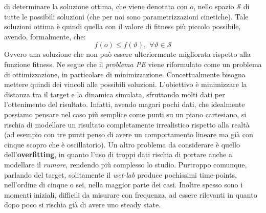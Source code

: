 \documentclass[a4paper,12pt, oneside]{book}
\begin{document}
di 
determinare la soluzione ottima, che viene denotata con $o$, nello spazio
$\mathcal{S}$ di tutte le possibili soluzioni (che per noi sono
parametrizzazioni cinetiche). Tale soluzioni ottima è quindi quella con il
valore di fitness più piccolo possibile, avendo, formalmente, che:
\[f(o)\leq f(\vartheta),\,\,\forall\vartheta\in \mathcal{S}\]
Ovvero una soluzione che non può essere ulteriormente migliorata rispetto alla
funzione fitness. Ne segue che il \textit{problema PE} viene riformulato come un
problema di ottimizzazione, in particolare di minimizzazione. Concettualmente
bisogna mettere quindi dei vincoli alle possibili soluzioni. L'obiettivo è
minimizzare la distanza tra il target e la dinamica simulata, sfruttando molti
dati per l'ottenimento del risultato. Infatti, avendo magari pochi dati, che
idealmente possiamo pensare nel caso più semplice come punti su un piano
cartesiano, si rischia di modellare un risultato completamente irrealistico
rispetto alla realtà (ad esempio con tre punti penso di avere un comportamento
lineare ma già con cinque scopro che è oscillatorio).
Un altro problema da considerare è quello dell'\textbf{overfitting}, in quanto
l'uso di troppi dati rischia di portare anche a modellare il \textit{rumore},
rendendo più complesso lo studio. Purtroppo comunque, parlando del target,
solitamente il \textit{wet-lab} produce pochissimi time-points, nell'ordine di
cinque o sei, nella maggior parte dei casi. Inoltre spesso sono i momenti
iniziali, difficili da misurare con frequenza, ad essere rilevanti in quanto
dopo poco si rischia già di avere uno steady state.
\end{document}
